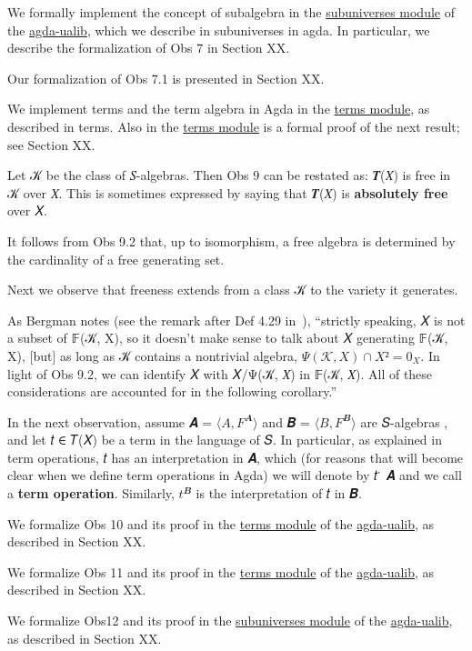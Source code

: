 \documentclass[sigplan,screen]{acmart}
\newcommand{\agdaualib}{\href{https://ualib.org}{agda-ualib}\xspace}
\newcommand\termsmodule{\href{https://gitlab.com/ualib/ualib.gitlab.io/-/blob/master/terms.lagda.rst}{terms module}\xspace}
\newcommand\subuniversesmodule{\href{https://gitlab.com/ualib/ualib.gitlab.io/-/blob/master/subuniverses.lagda.rst}{subuniverses module}\xspace}
\begin{document}
We formally implement the concept of subalgebra in the \subuniversesmodule of the \agdaualib, which we describe in subuniverses in agda. In particular, we describe the formalization of Obs 7 in Section XX. %

Our formalization of Obs 7.1 is presented in Section XX. %

We implement terms and the term algebra in Agda in the \termsmodule, as described in terms. Also in the \termsmodule is a formal proof of the next result; see Section XX. %

Let 𝒦 be the class of 𝑆-algebras. Then Obs 9 can be restated as: 𝑻(𝑋) is free in 𝒦 over 𝑋. This is sometimes expressed by saying that 𝑻(𝑋) is \textbf{absolutely free} over 𝑋.

It follows from Obs 9.2 that, up to isomorphism, a free algebra is determined by the cardinality of a free generating set.

Next we observe that freeness extends from a class 𝒦 to the variety it generates.

As Bergman notes (see the remark after Def 4.29 in~\cite{Bergman:2012}), ``strictly speaking, 𝑋 is not a subset of 𝔽(𝒦, X), so it doesn't make sense to talk about 𝑋 generating 𝔽(𝒦, X), [but] as long as 𝒦 contains a nontrivial algebra, \(Ψ(𝒦, 𝑋) ∩ 𝑋² = 0_X\). In light of Obs 9.2, we can identify 𝑋 with 𝑋/Ψ(𝒦, 𝑋) in 𝔽(𝒦, 𝑋). All of these considerations are accounted for in the following corollary.''

In the next observation, assume 𝑨 = \(⟨A, F^{𝑨}⟩\) and 𝑩 = \(⟨B, F^{𝑩}⟩\) are 𝑆-algebras , and let 𝑡 ∈ 𝑇(𝑋) be a term in the language of 𝑆. In particular, as explained in term operations, 𝑡 has an interpretation in 𝑨, which (for reasons that will become clear when we define term operations in Agda) we will denote by 𝑡 ̇ 𝑨 and we call a \textbf{term operation}. Similarly, \(t^{𝑩}\) is the interpretation of 𝑡 in 𝑩.

We formalize Obs 10 and its proof in the \termsmodule of the \agdaualib, as described in Section XX. %

We formalize Obs 11 and its proof in the \termsmodule of the \agdaualib, as described in Section XX. %

We formalize Obs12 and its proof in the \subuniversesmodule of the \agdaualib, as described in Section XX. %

\end{document}
